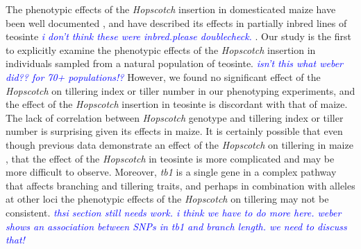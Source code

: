 \documentclass[11pt]{article}
\newcommand{\jri}[1]{\textcolor{blue}{ \emph{\scriptsize  #1}} }
\begin{document}
\begin{linenumbers}
\begin{flushleft}
The phenotypic effects of the \emph{Hopscotch} insertion in domesticated maize have been well documented \citep{Clark2006, Studer2011}, and \citet{Weber2007} have described its effects in partially inbred lines of teosinte \citep{Weber2007} \jri{i don't think these were inbred.please doublecheck.}. Our study is the first to explicitly examine the phenotypic effects of the \emph{Hopscotch} insertion in individuals sampled from a natural population of teosinte. \jri{isn't this what weber did?? for 70+ populations!?} However, we found no significant effect of the \emph{Hopscotch} on tillering index or tiller number in our phenotyping experiments, and the effect of the \emph{Hopscotch} insertion in teosinte is discordant with that of maize. The lack of correlation between \emph{Hopscotch} genotype and tillering index or tiller number is surprising given its effects in maize. It is certainly possible that even though previous data demonstrate an effect of the \emph{Hopscotch} on tillering in maize \citep{Studer2011}, that the effect of the \emph{Hopscotch} in teosinte is more complicated and may be more difficult to observe. Moreover, \emph{tb1} is a single gene in a complex pathway that affects branching and tillering traits, and perhaps in combination with alleles at other loci the phenotypic effects of the \emph{Hopscotch} on tillering may not be consistent. \jri{thsi section still needs work. i think we have to do more here. weber shows an association between SNPs in tb1 and branch length. we need to discuss that!}


\end{flushleft}
\end{linenumbers}
\end{document}
